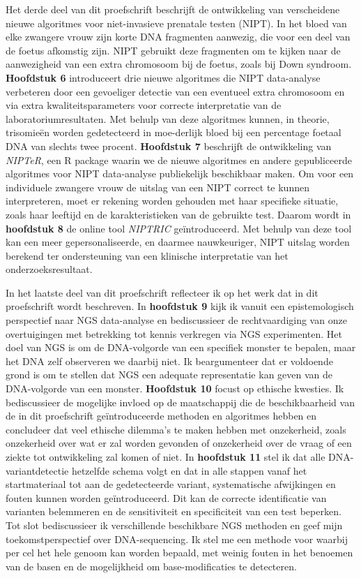\begin{appendices}
	Het derde deel van dit proefschrift beschrijft de ontwikkeling van verscheidene nieuwe algoritmes voor niet-invasieve prenatale testen (NIPT). In het bloed van elke zwangere vrouw zijn korte DNA fragmenten aanwezig, die voor een deel van de foetus afkomstig zijn. NIPT gebruikt deze fragmenten om te kijken naar de aanwezigheid van een extra chromosoom bij de foetus, zoals bij Down syndroom. \textbf{Hoofdstuk 6} introduceert drie nieuwe algoritmes die NIPT data-analyse verbeteren door een gevoeliger detectie van een eventueel extra chromosoom en via extra kwaliteitsparameters voor correcte interpretatie van de laboratoriumresultaten. Met behulp van deze algoritmes kunnen, in theorie, trisomieën worden gedetecteerd in moe-derlijk bloed bij een percentage foetaal DNA van slechts twee procent. \textbf{Hoofdstuk 7} beschrijft de ontwikkeling van \textsl{NIPTeR}, een R package waarin we de nieuwe algoritmes en andere gepubliceerde algoritmes voor NIPT data-analyse publiekelijk beschikbaar maken. Om voor een individuele zwangere vrouw de uitslag van een NIPT correct te kunnen interpreteren, moet er rekening worden gehouden met haar specifieke situatie, zoals haar leeftijd en de karakteristieken van de gebruikte test. Daarom wordt in \textbf{hoofdstuk 8} de online tool \textsl{NIPTRIC} geïntroduceerd. Met behulp van deze tool kan een meer gepersonaliseerde, en daarmee nauwkeuriger, NIPT uitslag worden berekend ter ondersteuning van een klinische interpretatie van het onderzoeksresultaat. 
	
	In het laatste deel van dit proefschrift reflecteer ik op het werk dat in dit proefschrift wordt beschreven. In \textbf{hoofdstuk 9} kijk ik vanuit een epistemologisch perspectief naar NGS data-analyse en bediscussieer de rechtvaardiging van onze overtuigingen met betrekking tot kennis verkregen via NGS experimenten. Het doel van NGS is om de DNA-volgorde van een specifiek monster te bepalen, maar het DNA zelf observeren we daarbij niet. Ik beargumenteer dat er voldoende grond is om te stellen dat NGS een adequate representatie kan geven van de DNA-volgorde van een monster. \textbf{Hoofdstuk 10} focust op ethische kwesties. Ik bediscussieer de mogelijke invloed op de maatschappij die de beschikbaarheid van de in dit proefschrift geïntroduceerde methoden en algoritmes hebben en concludeer dat veel ethische dilemma’s te maken hebben met onzekerheid, zoals onzekerheid over wat er zal worden gevonden of onzekerheid over de vraag of een ziekte tot ontwikkeling zal komen of niet. In \textbf{hoofdstuk 11} stel ik dat alle DNA-variantdetectie hetzelfde schema volgt en dat in alle stappen vanaf het startmateriaal tot aan de gedetecteerde variant, systematische afwijkingen en fouten kunnen worden geïntroduceerd. Dit kan de correcte identificatie van varianten belemmeren en de sensitiviteit en specificiteit van een test beperken. Tot slot bediscussieer ik verschillende beschikbare NGS methoden en geef mijn toekomstperspectief over DNA-sequencing. Ik stel me een methode voor waarbij per cel het hele genoom kan worden bepaald, met weinig fouten in het benoemen van de basen en de mogelijkheid om base-modificaties te detecteren.
	

\end{appendices}
